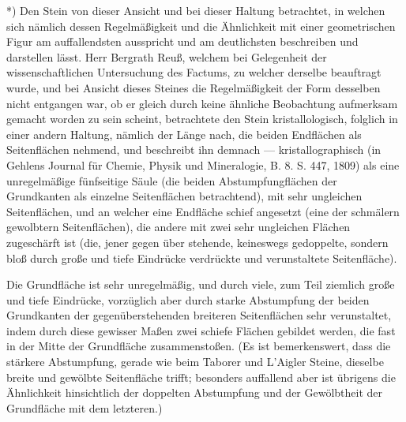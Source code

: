 \documentclass[a4paper, 11pt, oneside, german]{article}
\begin{document}
*) Den Stein von dieser Ansicht und bei dieser Haltung betrachtet, in welchen sich nämlich dessen Regelmäßigkeit und die Ähnlichkeit mit einer geometrischen Figur am auffallendsten ausspricht und am deutlichsten beschreiben und darstellen lässt.  
Herr Bergrath Reuß, welchem bei Gelegenheit der wissenschaftlichen Untersuchung des Factums, zu welcher derselbe beauftragt wurde, und bei Ansicht dieses Steines die Regelmäßigkeit der Form desselben nicht entgangen war, ob er gleich durch keine ähnliche Beobachtung aufmerksam gemacht worden zu sein scheint, betrachtete den Stein kristallologisch, folglich in einer andern Haltung, nämlich der Länge nach, die beiden Endflächen als Seitenflächen nehmend, und beschreibt ihn demnach --- kristallographisch (in Gehlens Journal für Chemie, Physik und Mineralogie, B. 8. S. 447, 1809) als eine unregelmäßige fünfseitige Säule (die beiden Abstumpfungflächen der Grundkanten als einzelne Seitenflächen betrachtend), mit sehr ungleichen Seitenflächen, und an welcher eine Endfläche schief angesetzt (eine der schmälern gewolbtern Seitenflächen), die andere mit zwei sehr ungleichen Flächen zugeschärft ist (die, jener gegen über stehende, keineswegs gedoppelte, sondern bloß durch große und tiefe Eindrücke verdrückte und verunstaltete Seitenfläche).

Die Grundfläche ist sehr unregelmäßig, und durch viele, zum Teil ziemlich große und tiefe Eindrücke, vorzüglich aber durch starke Abstumpfung der beiden Grundkanten der gegenüberstehenden breiteren Seitenflächen sehr verunstaltet, indem durch diese gewisser Maßen zwei schiefe Flächen gebildet werden, die fast in der Mitte der Grundfläche zusammenstoßen. (Es ist bemerkenswert, dass die stärkere Abstumpfung, gerade wie beim Taborer und L'Aigler Steine, dieselbe breite und gewölbte Seitenfläche trifft; besonders auffallend aber ist übrigens die Ähnlichkeit hinsichtlich der doppelten Abstumpfung und der Gewölbtheit der Grundfläche mit dem letzteren.)
\end{document}
